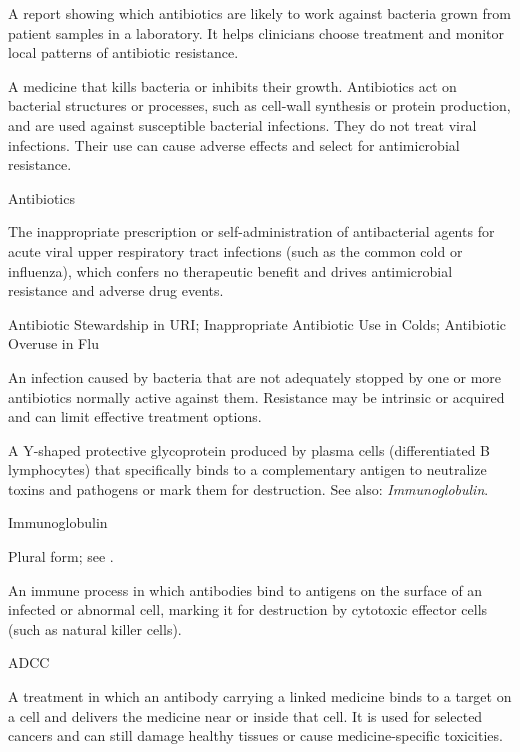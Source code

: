  A report showing which antibiotics are likely to work against bacteria grown from patient samples in a laboratory. It helps clinicians choose treatment and monitor local patterns of antibiotic resistance.

 A medicine that kills bacteria or inhibits their growth. Antibiotics act on bacterial structures or processes, such as cell-wall
synthesis or protein production, and are used against susceptible bacterial infections. They do not treat viral infections. Their use
can cause adverse effects and select for antimicrobial resistance.

\synonyms
Antibiotics

 The inappropriate prescription or self-administration of antibacterial agents for acute viral upper respiratory tract infections (such as the common cold or influenza), which confers no therapeutic benefit and drives antimicrobial resistance and adverse drug events.

\synonyms
Antibiotic Stewardship in URI; Inappropriate Antibiotic Use in Colds; Antibiotic Overuse in Flu

 An infection caused by bacteria that are not adequately stopped by one or more antibiotics normally active against them. Resistance may be intrinsic or acquired and can limit effective treatment options.

 A Y-shaped protective glycoprotein produced by plasma cells (differentiated B lymphocytes) that specifically binds to a complementary antigen to neutralize toxins and pathogens or mark them for destruction. See also: \textit{Immunoglobulin}.

\synonyms
Immunoglobulin

 Plural form; see .

 An immune process in which antibodies bind to antigens on the surface of an infected or abnormal cell, marking it for destruction by cytotoxic effector cells (such as natural killer cells).

\synonyms
ADCC

 A treatment in which an antibody carrying a linked medicine binds to a target on a cell and delivers the medicine near or inside that cell. It is used for selected cancers and can still damage healthy tissues or cause medicine-specific toxicities.

